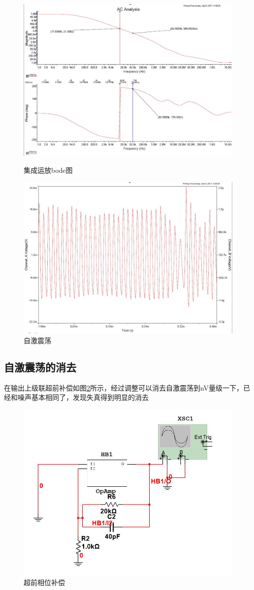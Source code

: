 \documentclass[UTF8,a4paper]{ctexart}
\begin{document}
\begin{figure}
\centering
\includegraphics[width=\textwidth]{ffail.jpg}
\caption{集成运放bode图}
\label{bode}
\includegraphics[width=\textwidth]{self.jpg}
\caption{自激震荡}
\label{exp}
\end{figure}
\subsection{自激震荡的消去}
在输出上级联超前补偿如图\ref{slu}所示，经过调整可以消去自激震荡到nV量级一下，已经和噪声基本相同了，发现失真得到明显的消去
\begin{figure}
\centering
\includegraphics[width=\textwidth]{ok.jpg}
\caption{超前相位补偿}
\label{slu}
\end{figure}
\end{document}
